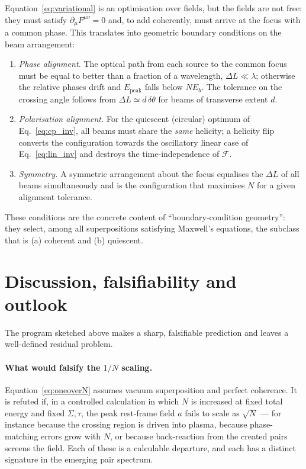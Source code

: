 \documentclass[aps,prd,reprint,superscriptaddress,nofootinbib,floatfix]{revtex4-2}
\begin{document}
Equation~\eqref{eq:variational} is an optimisation over fields, but the fields
are not free: they must satisfy $\partial_\mu F^{\mu\nu}=0$ and, to add
coherently, must arrive at the focus with a common phase. This translates into
geometric boundary conditions on the beam arrangement:
\begin{enumerate}
\item \emph{Phase alignment.} The optical path from each source to the common
focus must be equal to better than a fraction of a wavelength,
$\Delta L\ll\lambda$; otherwise the relative phases drift and
$E_{\mathrm{peak}}$ falls below $N E_b$. The tolerance on the crossing angle
follows from $\Delta L\simeq d\,\delta\theta$ for beams of transverse extent
$d$.
\item \emph{Polarisation alignment.} For the quiescent (circular) optimum of
Eq.~\eqref{eq:cp_inv}, all beams must share the \emph{same} helicity; a
helicity flip converts the configuration towards the oscillatory linear case
of Eq.~\eqref{eq:lin_inv} and destroys the time-independence of $\mathcal{F}$.
\item \emph{Symmetry.} A symmetric arrangement about the focus equalises the
$\Delta L$ of all beams simultaneously and is the configuration that maximises
$N$ for a given alignment tolerance.
\end{enumerate}
These conditions are the concrete content of ``boundary-condition geometry'':
they select, among all superpositions satisfying Maxwell's equations, the
subclass that is (a) coherent and (b) quiescent.

\section{Discussion, falsifiability and outlook}
\label{sec:discussion}

The program sketched above makes a sharp, falsifiable prediction and leaves a
well-defined residual problem.

\paragraph{What would falsify the $1/N$ scaling.} Equation~\eqref{eq:oneoverN}
assumes vacuum superposition and perfect coherence. It is refuted if, in a
controlled calculation in which $N$ is increased at fixed total energy and
fixed $\Sigma,\tau$, the peak rest-frame field $a$ fails to scale as
$\sqrt{N}$ --- for instance because the crossing region is driven into plasma,
because phase-matching errors grow with $N$, or because back-reaction from the
created pairs screens the field. Each of these is a calculable departure, and
each has a distinct signature in the emerging pair spectrum.
\end{document}
